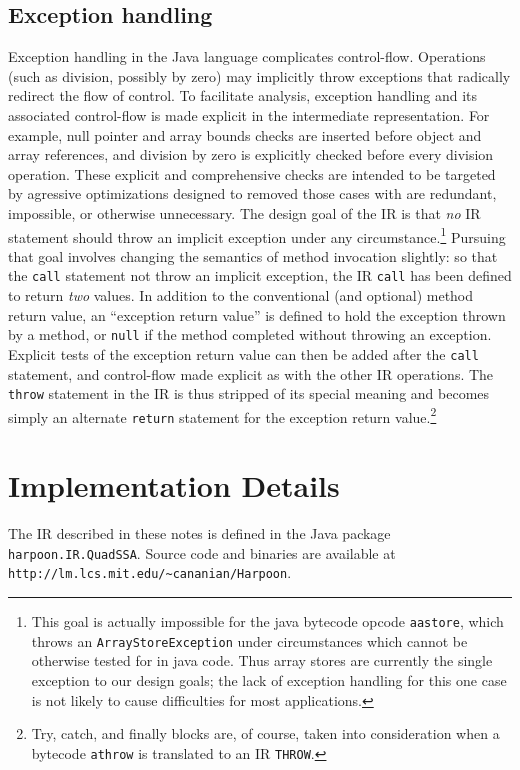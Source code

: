 \documentclass[11pt,notitlepage,twocolumn,twoside]{article}
\newcommand{\bp}{\hspace{0pt}}
\begin{document}
\subsection{Exception handling}
Exception handling in the Java language complicates control-flow.
Operations (such as division, possibly by zero) may implicitly throw
exceptions that radically redirect the flow of control.  To facilitate
analysis, exception handling and its associated control-flow is made
explicit in the intermediate representation.  For example, null
pointer and array bounds checks are inserted before object and array
references, and division by zero is explicitly checked before every
division operation.  These explicit and comprehensive checks are
intended to be targeted by agressive optimizations designed to
removed those cases with are redundant, impossible, or otherwise
unnecessary.  The design goal of the IR is that \textit{no} IR
statement should throw an implicit exception under any 
circumstance.\footnote{This goal is actually impossible for the java
bytecode opcode \texttt{aastore}, which throws an
\texttt{ArrayStoreException} under circumstances which cannot be
otherwise tested for in java code.  Thus array stores are
currently the single exception to our design goals; the lack of exception
handling for this one case is not likely to cause difficulties for most
applications.}  Pursuing that goal involves changing the semantics of method
invocation slightly: so that the \texttt{call} statement not throw an
implicit exception, the IR \texttt{call} has been defined to return
\textit{two} values.  In addition to the conventional (and optional)
method return value, an ``exception return value'' is defined to hold
the exception thrown by a method, or \texttt{null} if the method
completed without throwing an exception.  Explicit tests of the
exception return value can then be added after the \texttt{call}
statement, and control-flow made explicit as with the other IR
operations.  The \texttt{throw} statement in the IR is thus stripped
of its special meaning and becomes simply an alternate \texttt{return}
statement for the exception return value.\footnote{Try, catch, and
finally blocks are, of course, taken into consideration when a
bytecode \texttt{athrow} is translated to an IR \texttt{THROW}.}

\section{Implementation Details}

The IR described in these notes is defined in the Java package
\texttt{harpoon.IR.QuadSSA}.  Source code and binaries are available
at {\tt\small http://\bp lm.lcs.mit.edu/\bp \~{}cananian/\bp Harpoon}.
\end{document}
